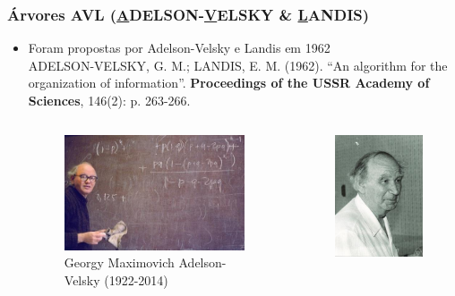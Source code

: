 \documentclass[aspectratio=169]{beamer}
\begin{document}
\begin{frame}\frametitle{Árvores AVL (\underline{A}DELSON-\underline{V}ELSKY \& \underline{L}ANDIS)}
\begin{itemize}
	\item Foram propostas por Adelson-Velsky e Landis em 1962\\
ADELSON-VELSKY, G. M.; LANDIS, E. M. (1962). ``An algorithm for the organization of information''. \textbf{Proceedings of the USSR Academy of Sciences}, 146(2): p. 263-266.\\
\begin{columns}[T]
\begin{column}{0.5\linewidth}
\begin{figure}[h]
	\centering
	\includegraphics[height=0.3\paperheight]{imagens/adelson_velsky.jpg}\\
	\tiny{Georgy Maximovich Adelson-Velsky (1922-2014)}
\end{figure}
\end{column}
	\begin{column}{0.5\linewidth}
\begin{figure}[h]
	\centering
	\includegraphics[height=0.3\paperheight]{imagens/landis.jpg}\\

\end{figure}
\end{column}
\end{columns}
\end{itemize}
\end{frame}
\end{document}
